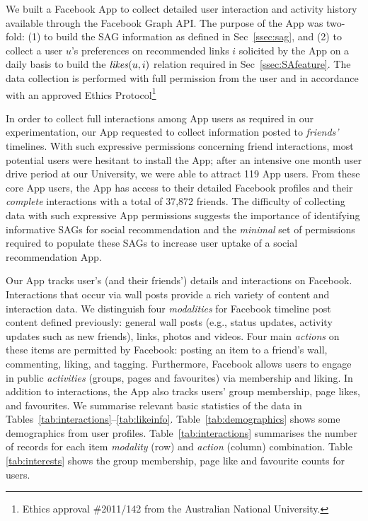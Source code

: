 
We built a Facebook App to collect detailed user interaction and
activity history available through the Facebook Graph API.  The
purpose of the App was two-fold: (1) to build the SAG information as
defined in Sec~\ref{ssec:sag}, and (2) to collect a user $u$'s preferences on
recommended links $i$ solicited by the App on a daily basis to build
the $\likes(u,i)$ relation required in Sec~\ref{ssec:SAfeature}.  The
data collection is performed with full permission from the user and in
accordance with an approved Ethics Protocol\footnote{Ethics approval 
\#2011/142 from the Australian National University.}

In order to collect full interactions among App users as required in
our experimentation, our App requested to collect information posted
to \emph{friends'} timelines.  With such expressive permissions
concerning friend interactions, most potential users were hesitant to
install the App; after an intensive one month user drive period at our
University, we were able to attract 119 App users.  From these core
App users, the App has access to their detailed Facebook profiles and
their \emph{complete} interactions with a total of 37,872 friends.
The difficulty of collecting data with such expressive App permissions
suggests the importance of identifying informative SAGs for social
recommendation and the \emph{minimal} set of permissions required to
populate these SAGs to increase user uptake of a social recommendation
App.

Our App tracks user's (and their friends') details and interactions on
Facebook.  Interactions that occur via wall posts provide a rich
variety of content and interaction data.  We distinguish
four \emph{modalities} for Facebook timeline post content defined previously:
general wall posts (e.g., status updates, activity updates such as new
friends), links, photos and videos. Four main \emph{actions} on these
items are permitted by Facebook: posting an item to a friend's wall,
commenting, liking, and tagging. Furthermore, Facebook allows users to
engage in public \emph{activities} (groups, pages and favourites) via membership
and liking. In addition to interactions, the App also tracks users'
group membership, page likes, and favourites.
We summarise relevant basic statistics of the data in
Tables~\ref{tab:interactions}--\ref{tab:likeinfo}.
Table~\ref{tab:demographics} shows some demographics from user
profiles.  Table~\ref{tab:interactions} summarises the number of
records for each item \emph{modality} (row) and \emph{action} (column)
combination. Table \ref{tab:interests} shows the group membership,
page like and favourite counts for users.

